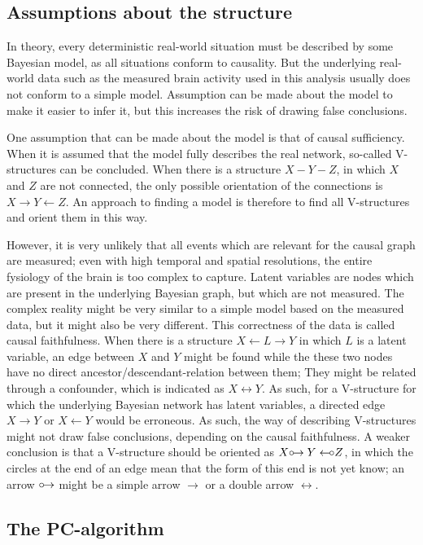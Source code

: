 \documentclass[a4paper, 10pt, english, onecolumn]{article}
\def \orightarrow {\circ\hspace{-0.42em}\rightarrow}
\def \oleftarrow {\leftarrow\hspace{-0.42em}\circ}
\begin{document}
\subsection{Assumptions about the structure}
In theory, every deterministic real-world situation must be described by some Bayesian model, as all situations conform to causality.
But the underlying real-world data such as the measured brain activity used in this analysis usually does not conform to a simple model.
Assumption can be made about the model to make it easier to infer it, but this increases the risk of drawing false conclusions.

One assumption that can be made about the model is that of causal sufficiency. 
When it is assumed that the model fully describes the real network, so-called V-structures can be concluded. 
When there is a structure $X - Y - Z$, in which $X$ and $Z$ are not connected, the only possible orientation of the connections is $X \rightarrow Y \leftarrow Z$. %
An approach to finding a model is therefore to find all V-structures and orient them in this way.

However, it is very unlikely that all events which are relevant for the causal graph are measured; 
even with high temporal and spatial resolutions, the entire fysiology of the brain is too complex to capture.
Latent variables are nodes which are present in the underlying Bayesian graph, but which are not measured.
The complex reality might be very similar to a simple model based on the measured data, but it might also be very different.
This correctness of the data is called causal faithfulness.
When there is a structure $X \leftarrow L \rightarrow Y$ in which $L$ is a latent variable, an edge between $X$ and $Y$ might be found while the these two nodes have no direct ancestor/descendant-relation between them;
They might be related through a confounder, which is indicated as $X \leftrightarrow Y$.
As such, for a V-structure for which the underlying Bayesian network has latent variables, a directed edge $X \rightarrow Y$ or $X \leftarrow Y$ would be erroneous. 
As such, the way of describing V-structures might not draw false conclusions, depending on the causal faithfulness. 
A weaker conclusion is that a V-structure should be oriented as $X \orightarrow Y \oleftarrow Z$, in which the circles at the end of an edge mean that the form of this end is not yet know; an arrow $\orightarrow$ might be a simple arrow $\rightarrow$ or a double arrow $\leftrightarrow$.

\subsection{The PC-algorithm}
\end{document}
